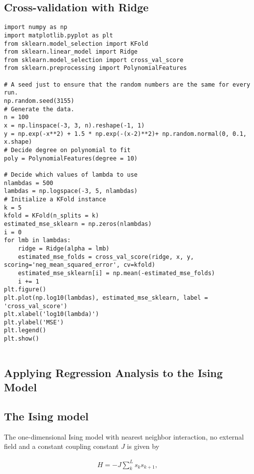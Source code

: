 \documentclass[%
oneside,                 %
final,                   %
10pt]{article}
\begin{document}
\subsection*{Cross-validation with Ridge}
\begin{verbatim}
import numpy as np
import matplotlib.pyplot as plt
from sklearn.model_selection import KFold
from sklearn.linear_model import Ridge
from sklearn.model_selection import cross_val_score
from sklearn.preprocessing import PolynomialFeatures

# A seed just to ensure that the random numbers are the same for every run.
np.random.seed(3155)
# Generate the data.
n = 100
x = np.linspace(-3, 3, n).reshape(-1, 1)
y = np.exp(-x**2) + 1.5 * np.exp(-(x-2)**2)+ np.random.normal(0, 0.1, x.shape)
# Decide degree on polynomial to fit
poly = PolynomialFeatures(degree = 10)

# Decide which values of lambda to use
nlambdas = 500
lambdas = np.logspace(-3, 5, nlambdas)
# Initialize a KFold instance
k = 5
kfold = KFold(n_splits = k)
estimated_mse_sklearn = np.zeros(nlambdas)
i = 0
for lmb in lambdas:
    ridge = Ridge(alpha = lmb)
    estimated_mse_folds = cross_val_score(ridge, x, y, scoring='neg_mean_squared_error', cv=kfold)
    estimated_mse_sklearn[i] = np.mean(-estimated_mse_folds)
    i += 1
plt.figure()
plt.plot(np.log10(lambdas), estimated_mse_sklearn, label = 'cross_val_score')
plt.xlabel('log10(lambda)')
plt.ylabel('MSE')
plt.legend()
plt.show()


\end{verbatim}






\subsection*{Applying Regression Analysis to the Ising Model}



\subsection*{The Ising model}

The one-dimensional Ising model with nearest neighbor interaction, no
external field and a constant coupling constant $J$ is given by

\begin{align}
    H = -J \sum_{k}^L s_k s_{k + 1},
\end{align}
\end{document}
